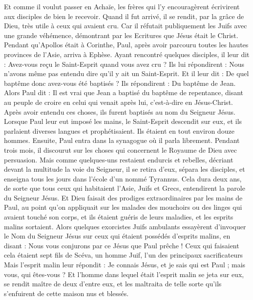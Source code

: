 \begin{multicols}{2}
Et comme il voulut passer en Achaïe, les frères qui l'y encouragèrent écrivirent aux disciples de bien le recevoir. Quand il fut arrivé, il se rendit, par la grâce de Dieu, très utile à ceux qui avaient cru.
Car il réfutait publiquement les Juifs avec une grande véhémence, démontrant par les Ecritures que Jésus était le Christ.
\VerseOne{}Pendant qu’Apollos était à Corinthe, Paul, après avoir parcouru toutes les hautes provinces de l’Asie, arriva à Ephèse. Ayant rencontré quelques disciples, il leur dit :
Avez-vous reçu le Saint-Esprit quand vous avez cru ? Ils lui répondirent : Nous n'avons même pas entendu dire qu’il y ait un Saint-Esprit.
Et il leur dit : De quel baptême donc avez-vous été baptisés ? Ils répondirent : Du baptême de Jean.
Alors Paul dit : Il est vrai que Jean a baptisé du baptême de repentance, disant au peuple de croire en celui qui venait après lui, c'est-à-dire en Jésus-Christ.
Après avoir entendu ces choses, ils furent baptisés au nom du Seigneur Jésus.
Lorsque Paul leur eut imposé les mains, le Saint-Esprit descendit sur eux, et ils parlaient diverses langues et prophétisaient.
Ils étaient en tout environ douze hommes.
Ensuite, Paul entra dans la synagogue où il parla librement. Pendant trois mois, il discourut sur les choses qui concernent le Royaume de Dieu avec persuasion.
Mais comme quelques-uns restaient endurcis et rebelles, décriant devant la multitude la voie du Seigneur, il se retira d’eux, sépara les disciples, et enseigna tous les jours dans l'école d'un nommé Tyrannus.
Cela dura deux ans, de sorte que tous ceux qui habitaient l’Asie, Juifs et Grecs, entendirent la parole du Seigneur Jésus.
Et Dieu faisait des prodiges extraordinaires par les mains de Paul,
au point qu’on appliquait sur les malades des mouchoirs ou des linges qui avaient touché son corps, et ils étaient guéris de leurs maladies, et les esprits malins sortaient.
Alors quelques exorcistes Juifs ambulants essayèrent d'invoquer le Nom du Seigneur Jésus sur ceux qui étaient possédés d’esprits malins, en disant : Nous vous conjurons par ce Jésus que Paul prêche !
Ceux qui faisaient cela étaient sept fils de Scéva, un homme Juif, l’un des principaux sacrificateurs
Mais l’esprit malin leur répondit : Je connais Jésus, et je sais qui est Paul ; mais vous, qui êtes-vous ?
Et l'homme dans lequel était l’esprit malin se jeta sur eux, se rendit maître de deux d’entre eux, et les maltraita de telle sorte qu’ils s'enfuirent de cette maison nus et blessés.

\end{multicols}
